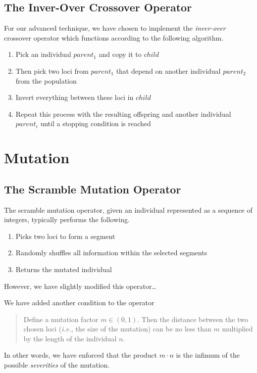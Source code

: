 \documentclass[xcolor={usenames,dvipsnames,svgnames}]{beamer}
\begin{document}
\subsection{The Inver-Over Crossover Operator}
\begin{frame}
For our advanced technique, we have chosen to implement the {\em inver-over} crossover operator which functions according to the following algorithm.
\begin{enumerate}
	\item<1-> Pick an individual $parent_1$ and copy it to $child$
	\item<2-> Then pick two loci from $parent_1$ that depend on another individual $parent_2$ from the population
	\item<3-> Invert everything between these loci in $child$
	\item<4-> Repeat this process with the resulting offspring and another individual $parent_i$ until a stopping condition is reached
\end{enumerate}
\end{frame}

\section{Mutation}
\subsection{The Scramble Mutation Operator}
\begin{frame}
The scramble mutation operator, given an individual represented as a sequence of integers, typically performs the following.
\begin{enumerate}
	\item<1-> Picks two loci to form a segment
	\item<2-> Randomly shuffles all information within the selected segments
	\item<3-> Returns the mutated individual
\end{enumerate}
\pause
However, we have slightly modified this operator\ldots
\end{frame}

\begin{frame}
We have added another condition to the operator\par
\pause 
\begin{quote}
	Define a mutation factor $m \in (0, 1)$. Then the distance between the two chosen loci ({\em i.e.,} the size of the mutation) can be no less than $m$ multiplied by the length of the individual $n$. 
\end{quote}
\pause 
In other words, we have enforced that the product $m \cdot n$ is the infimum of the possible {\em severities} of the mutation.
\end{frame}
\end{document}
